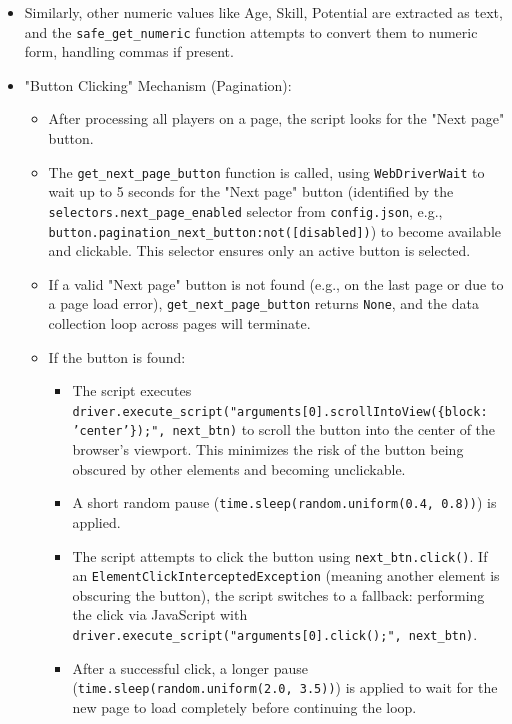 \documentclass[12pt, a4paper]{report}
\begin{document}
\begin{enumerate}[label=\textbf{Step \arabic*:}, leftmargin=* , itemsep=1ex]
\begin{itemize}[leftmargin=0em]
\begin{itemize}
        \end{itemize}
        \item Similarly, other numeric values like Age, Skill, Potential are extracted as text, and the \texttt{safe\_get\_numeric} function attempts to convert them to numeric form, handling commas if present.
        \item "Button Clicking" Mechanism (Pagination):
        \begin{itemize}
            \item After processing all players on a page, the script looks for the "Next page" button.
            \item The \texttt{get\_next\_page\_button} function is called, using \texttt{WebDriverWait} to wait up to 5 seconds for the "Next page" button (identified by the \texttt{selectors.next\_page\_enabled} selector from \texttt{config.json}, e.g., \texttt{button.pagination\_next\_button:not([disabled])}) to become available and clickable. This selector ensures only an active button is selected.
            \item If a valid "Next page" button is not found (e.g., on the last page or due to a page load error), \texttt{get\_next\_page\_button} returns \texttt{None}, and the data collection loop across pages will terminate.
            \item If the button is found:
            \begin{itemize}
                \item The script executes \sloppypar
                \texttt{driver.execute\_script("arguments[0].scrollIntoView(\{block: 'center'\});", next\_btn)} to scroll the button into the center of the browser's viewport. This minimizes the risk of the button being obscured by other elements and becoming unclickable.
                \item A short random pause \sloppypar
                (\texttt{time.sleep(random.uniform(0.4, 0.8))}) is applied.
                \item The script attempts to click the button using \texttt{next\_btn.click()}. If an \sloppypar
                \texttt{ElementClickInterceptedException} \sloppypar (meaning another element is obscuring the button), the script switches to a fallback: performing the click via JavaScript with \texttt{driver.execute\_script("arguments[0].click();", next\_btn)}.
                \item After a successful click, a longer pause (\texttt{time.sleep(random.uniform(2.0, 3.5))}) is applied to wait for the new page to load completely before continuing the loop.

\end{itemize}
\end{itemize}
\end{itemize}
\end{enumerate}
\end{document}
